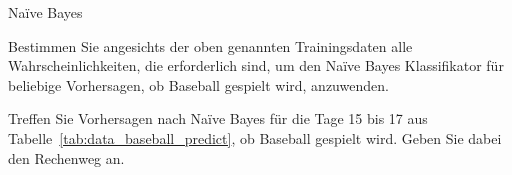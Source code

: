 \begin{task}[credit=19]{Na\"ive Bayes}
\begin{subtask}[title={Formel für Merkmalsausprägung},points=4]
\begin{solution}
\end{solution}

\end{subtask}
 
\begin{subtask}[title=Wahrscheinlichkeiten,points=6]
Bestimmen Sie angesichts der oben genannten Trainingsdaten alle Wahrscheinlichkeiten, die erforderlich sind, um den Na\"ive Bayes Klassifikator für beliebige Vorhersagen, ob Baseball gespielt wird, anzuwenden.

\begin{solution}
\end{solution}

\end{subtask}

\begin{subtask}[points=9,title=Vorhersage]
Treffen Sie Vorhersagen nach Na\"ive Bayes für die Tage 15 bis 17 aus Tabelle~\ref{tab:data_baseball_predict}, ob Baseball gespielt wird.
Geben Sie dabei den Rechenweg an.

\begin{solution}
\end{solution}

\end{subtask}
\end{task}
